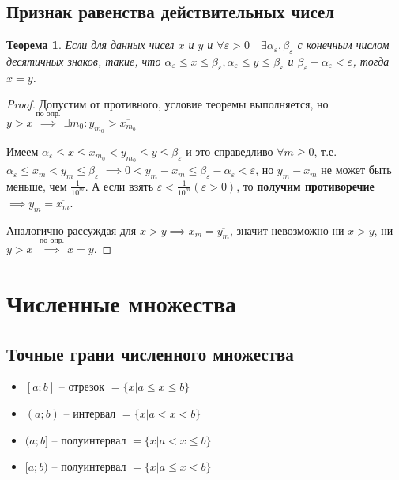 \documentclass[a4paper,oneside]{article}
\newcommand{\bydef}{\stackrel{\text{по опр.}}{\implies}} %
\newtheorem{theorem}{Теорема}[subsection]
\theoremstyle{definition}
\theoremstyle{definition}
\theoremstyle{definition}
\begin{document}
\subsection{Признак равенства действительных чисел}

\begin{theorem}
    Если для данных чисел $x$ и $y$ и 
    $\forall \varepsilon > 0 \quad \exists \alpha_{\varepsilon}, \beta_{\varepsilon}$
    с конечным числом десятичных знаков, такие, что
    $\alpha_{\varepsilon} \le x \le \beta_{\varepsilon}, \alpha_{\varepsilon} \le y \le \beta_{\varepsilon}$
    и $\beta_{\varepsilon} - \alpha_{\varepsilon} < \varepsilon$, тогда $x = y$.
\end{theorem}

\begin{proof}
    Допустим от противного, условие теоремы выполняется, но 
    $y > x \bydef \exists m_0: y_{m_0} > \overline{x_{m_0}}$

    Имеем $\alpha_{\varepsilon} \le x \le \overline{x_{m_0}} < y_{m_0} \le y \le \beta_{\varepsilon}$
    и это справедливо $\forall m \ge 0$, т.е. 
    $\alpha_{\varepsilon} \le \overline{x_m} < y_m \le \beta_{\varepsilon}$
    $\implies 0 < y_m - \overline{x_m} \le \beta_\varepsilon - \alpha_\varepsilon < \varepsilon$,
    но $y_m - \overline{x_m}$ не может быть меньше, чем $\frac{1}{10^m}$. А если взять
    $\varepsilon < \frac{1}{10^m} (\varepsilon > 0)$, то \textbf{получим противоречие}
    $\implies y_m = \overline{x_m}$.

    Аналогично рассуждая для $x > y \implies x_m = \overline{y_m}$, значит невозможно
    ни $x > y$, ни $y > x$ $\bydef x = y$.
\end{proof}

\section{Численные множества}

\subsection{Точные грани численного множества}

\begin{itemize}
    \item $[a;b]$ -- отрезок $= \{x | a \le x \le b\}$
    \item $(a;b)$ -- интервал $= \{x | a < x < b\}$
    \item $(a;b]$ -- полуинтервал $= \{x | a < x \le b\}$
    \item $[a;b)$ -- полуинтервал $= \{x | a \le x < b\}$
\end{itemize}
\end{document}
